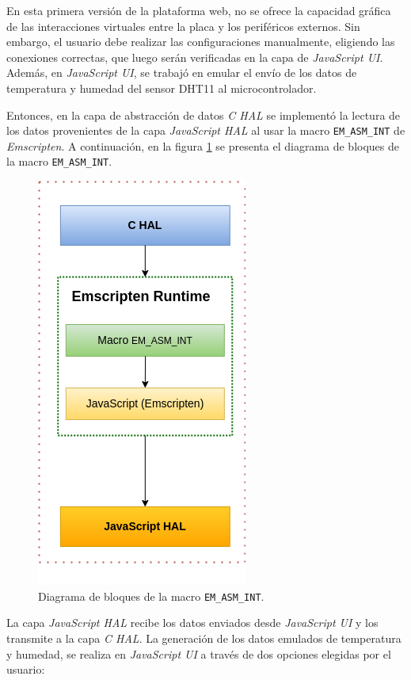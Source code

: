 En esta primera versión de la plataforma web, no se ofrece la capacidad gráfica de las interacciones virtuales entre la placa y los periféricos externos. Sin embargo, el usuario debe realizar las configuraciones manualmente, eligiendo las conexiones correctas, que luego serán verificadas en la capa de \textit{JavaScript UI}.
Además, en \textit{JavaScript UI}, se trabajó en emular el envío de los datos de temperatura y humedad del sensor DHT11 al microcontrolador.


Entonces, en la capa de abstracción de datos \textit{C HAL} se implementó la lectura de los datos provenientes de la capa \textit{JavaScript HAL} al usar la macro \texttt{EM\_ASM\_INT} de \textit{Emscripten}. A continuación, en la figura \ref{fig:dht11Emscripten} se presenta el diagrama de bloques de la macro \texttt{EM\_ASM\_INT}.

\begin{figure}[ht]
	\centering
	\includegraphics[scale=.53]{./Figures/dht11Emscripten.png}
	\caption{Diagrama de bloques de la macro \texttt{EM\_ASM\_INT}.}
	\label{fig:dht11Emscripten}
\end{figure}

La capa \textit{JavaScript HAL} recibe los datos enviados desde \textit{JavaScript UI} y los transmite a la capa \textit{C HAL}. La generación de los datos  emulados de temperatura y humedad, se realiza en \textit{JavaScript UI} a través de dos opciones elegidas por el usuario:
 
